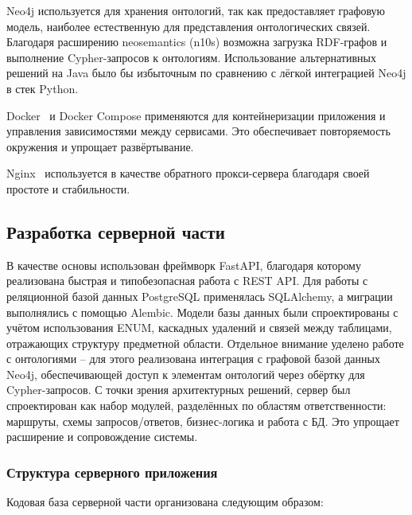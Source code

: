 Neo4j используется для хранения онтологий, так как предоставляет графовую модель, наиболее естественную для представления онтологических связей.
Благодаря расширению neosemantics (n10s) возможна загрузка RDF-графов и выполнение Cypher-запросов к онтологиям.
Использование альтернативных решений на Java было бы избыточным по сравнению с лёгкой интеграцией Neo4j в стек Python.

Docker~\cite{Tool:Docker} и Docker Compose применяются для контейнеризации приложения и управления зависимостями между сервисами.
Это обеспечивает повторяемость окружения и упрощает развёртывание.

Nginx~\cite{Tool:Nginx} используется в качестве обратного прокси-сервера благодаря своей простоте и стабильности.

\subsection{Разработка серверной части}

В качестве основы использован фреймворк FastAPI, благодаря которому реализована быстрая и типобезопасная работа с REST API.
Для работы с реляционной базой данных PostgreSQL применялась SQLAlchemy, а миграции выполнялись с помощью Alembic.
Модели базы данных были спроектированы с учётом использования ENUM, каскадных удалений и связей между таблицами, отражающих структуру предметной области.
Отдельное внимание уделено работе с онтологиями -- для этого реализована интеграция с графовой базой данных Neo4j, обеспечивающей доступ к элементам онтологий через обёртку для Cypher-запросов.
С точки зрения архитектурных решений, сервер был спроектирован как набор модулей, разделённых по областям ответственности: маршруты, схемы запросов/ответов, бизнес-логика и работа с БД.
Это упрощает расширение и сопровождение системы.

\subsubsection{Структура серверного приложения}

Кодовая база серверной части организована следующим образом:

